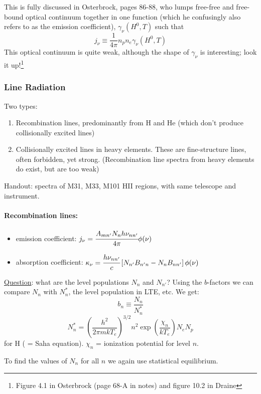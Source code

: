 \documentclass[11pt]{article}
\newcommand{\mar}[1]{\hspace{0pt}\marginpar{-\textcolor{black}{#1}-}}
\begin{document}
This is fully discussed in Osterbrock, pages 86-88, who lumps free-free
and free-bound optical continuum together in one function (which he
confusingly also refers to as the emission coefficient),
$ \gamma_{\nu}(H^{0}, T) $ such that
\[
    j_{\nu} \equiv \frac{1}{4\pi} n_{p}n_{e} \gamma_{\nu} (H^{0},T)
    \]
This optical continuum is quite weak, although the shape of $\gamma_{\nu}$
is interesting; look it up!\footnote{Figure 4.1 in Osterbrock
(page 68-A in notes) and figure 10.2 in Draine}

\subsubsection{Line Radiation}
\mar{69}Two types:
\begin{enumerate}
    \item Recombination lines, predominantly from H and He
        (which don't produce collisionally excited lines)
    \item Collisionally excited lines in heavy elements.
        These are fine-structure lines, often forbidden, yet strong.
        (Recombination line spectra from heavy elements do exist, but are too weak)
\end{enumerate}

Handout: spectra of M31, M33, M101 HII regions, with same
telescope and instrument.

\paragraph{Recombination lines:}
\begin{itemize}[itemsep=1ex]
    \item emission coefficient:
        $ j_{\nu} = \cfrac{A_{mn'} N_{n} h\nu_{nn'}}{4\pi} \phi(\nu) $
    \item absorption coefficient:
        $ \kappa_{\nu} = \cfrac{h\nu_{nn'}}{c} \left[
            N_{n'} B_{n'n} - N_{n} B_{nn'} \right] \phi(\nu)$
\end{itemize}
\underline{Question}: what are the level populations $N_{n}$ and $N_{n'}$?
Using the $b$-factors we can compare $N_{n}$ with $N_{n}^{*}$, the level
population in LTE, etc. We get:
\[
    b_{n} \equiv \frac{N_{n}}{N_{n}^{*}}
    \]
\[
    N_{n}^{*}
    = \left( \frac{h^{2}}{2{\pi}mkT_{e}}
    \right)^{3/2} n^{2} \exp \left( \frac{\chi_{n}}{kT_{e}}
    \right) N_{e} N_{p}
    \]
for H ( = Saha equation). $\chi_{n}$ = ionization potential for level $n$.

To find the values of $N_{n}$ for all $n$ we again use statistical equilibrium.
\end{document}
